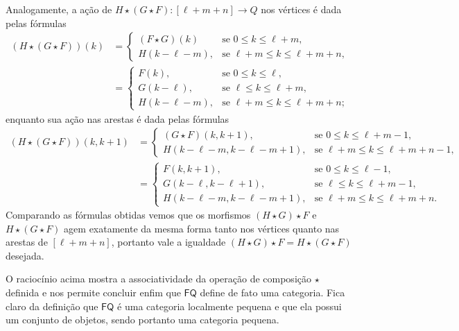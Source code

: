 Analogamente, a ação de $H \star (G \star F): [\ell+m+n] \to Q$ nos vértices é dada pelas fórmulas
\begin{align*}
    (H \star (G \star F))(k)
    & =
    \begin{cases}
        (F \star G)(k) & \text{se } 0 \leq k \leq \ell+m, \\
        H(k-\ell-m), & \text{se } \ell+m \leq k \leq \ell+m+n,
    \end{cases} \\
    & =
    \begin{cases}
        F(k), & \text{se } 0 \leq k \leq \ell, \\
        G(k-\ell), & \text{se } \ell \leq k \leq \ell+m, \\
        H(k-\ell-m), & \text{se } \ell+m \leq k \leq \ell+m+n;
    \end{cases}
\end{align*}
enquanto sua ação nas arestas é dada pelas fórmulas
\begin{align*}
    (H \star (G \star F))(k,k+1)
    & =
    \begin{cases}
        (G \star F)(k,k+1), & \text{se } 0 \leq k \leq \ell+m-1, \\
        H(k-\ell-m,k-\ell-m+1), & \text{se } \ell+m \leq k \leq \ell+m+n-1,
    \end{cases} \\
    & =
    \begin{cases}
        F(k,k+1), & \text{se } 0 \leq k \leq \ell-1, \\
        G(k-\ell,k-\ell+1), & \text{se } \ell \leq k \leq \ell+m-1, \\
        H(k-\ell-m,k-\ell-m+1), & \text{se } \ell+m \leq k \leq \ell+m+n.
    \end{cases}
\end{align*}
Comparando as fórmulas obtidas vemos que os morfismos $(H \star G) \star F$ e $H \star (G \star F)$ agem exatamente da mesma forma tanto nos vértices quanto nas arestas de $[\ell+m+n]$, portanto vale a igualdade $(H \star G) \star F = H \star (G \star F)$ desejada.

O raciocínio acima mostra a associatividade da operação de composição $\star$ definida e nos permite concluir enfim que $\mathsf{FQ}$ define de fato uma categoria.
Fica claro da definição que $\mathsf{FQ}$ é uma categoria localmente pequena e que ela possui um conjunto de objetos, sendo portanto uma categoria pequena.